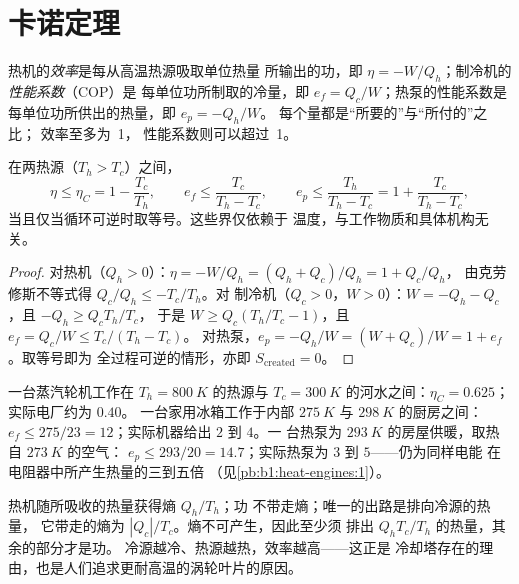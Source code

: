 \section{卡诺定理}

\begin{definition}[效率与性能系数]\label{def:b1:heat-engines:efficiency}
热机的\emph{效率}是每从高温热源吸取单位热量
所输出的功，即 $\eta = -W/Q_h$；制冷机的\emph{性能系数}（COP）是
每单位功所制取的冷量，即 $e_f = Q_c/W$；热泵的性能系数是
每单位功所供出的热量，即 $e_p = -Q_h/W$。
每个量都是“所要的”与“所付的”之比；
效率至多为~1，
性能系数则可以超过~1。
\end{definition}

\begin{theorem}[卡诺]\label{thm:b1:heat-engines:carnot}
在两热源（$T_h > T_c$）之间，
\[
\eta \leq \eta_C = 1 - \frac{T_c}{T_h}, \qquad
e_f \leq \frac{T_c}{T_h - T_c}, \qquad
e_p \leq \frac{T_h}{T_h - T_c} = 1 + \frac{T_c}{T_h - T_c},
\]
当且仅当循环可逆时取等号。这些界仅依赖于
温度，与工作物质和具体机构无关。
\end{theorem}

\begin{proof}
对热机（$Q_h > 0$）：$\eta = -W/Q_h = (Q_h + Q_c)/Q_h = 1 + Q_c/Q_h$，
由克劳修斯不等式得 $Q_c/Q_h \leq -T_c/T_h$。对
制冷机（$Q_c > 0$，$W > 0$）：$W = -Q_h - Q_c$，且 $-Q_h \geq Q_c T_h/T_c$，
于是 $W \geq Q_c(T_h/T_c - 1)$，且 $e_f = Q_c/W \leq T_c/(T_h - T_c)$。
对热泵，$e_p = -Q_h/W = (W + Q_c)/W = 1 + e_f$。取等号即为
全过程可逆的情形，亦即 $S_{\mathrm{created}} = 0$。
\end{proof}

\begin{example}[三个数]\label{ex:b1:heat-engines:numbers}
一台蒸汽轮机工作在 $T_h = \qty{800}{K}$ 的热源与
$T_c = \qty{300}{K}$ 的河水之间：$\eta_C = 0.625$；实际电厂约为 $0.40$。
一台家用冰箱工作于内部 $\qty{275}{K}$ 与
$\qty{298}{K}$ 的厨房之间：$e_f \leq 275/23 = 12$；实际机器给出 $2$ 到 $4$。一
台热泵为 $\qty{293}{K}$ 的房屋供暖，取热自 $\qty{273}{K}$ 的空气：
$e_p \leq 293/20 = 14.7$；实际热泵为 $3$ 到 $5$——仍为同样电能
在电阻器中所产生热量的三到五倍
（见\cref{pb:b1:heat-engines:1}）。
\end{example}

\begin{remark}[效率为何不能等于~1]\label{rem:b1:heat-engines:why}
热机随所吸收的热量获得熵 $Q_h/T_h$；功
不带走熵；唯一的出路是排向冷源的热量，
它带走的熵为 $|Q_c|/T_c$。熵不可产生，因此至少须
排出 $Q_h T_c/T_h$ 的热量，其余的部分才是功。
冷源越冷、热源越热，效率越高——这正是
冷却塔存在的理由，也是人们追求更耐高温的涡轮叶片的原因。
\end{remark}

